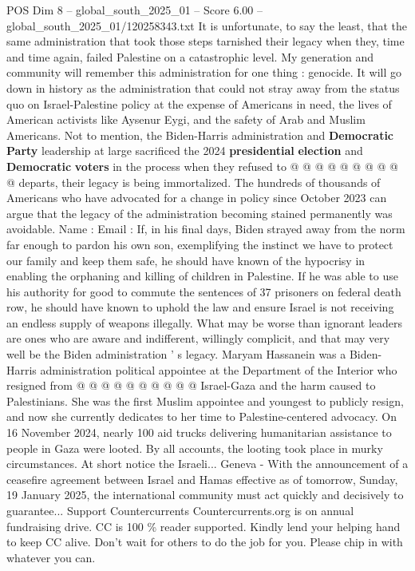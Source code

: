 \begin{textsample}{POS Dim 8 – global\_south\_2025\_01 – Score 6.00 – global\_south\_2025\_01/120258343.txt}
It is unfortunate, to say the least, that the same administration that took those steps tarnished their legacy when they, time and time again, failed Palestine on a catastrophic level.
My generation and community will remember this administration for one thing : genocide.
It will go down in history as the administration that could not stray away from the status quo on Israel-Palestine policy at the expense of Americans in need, the lives of American activists like Aysenur Eygi, and the safety of Arab and Muslim Americans.
Not to mention, the Biden-Harris administration and \textbf{Democratic} \textbf{Party} leadership at large sacrificed the 2024 \textbf{presidential} \textbf{election} and \textbf{Democratic} \textbf{voters} in the process when they refused to @ @ @ @ @ @ @ @ @ @ departs, their legacy is being immortalized.
The hundreds of thousands of Americans who have advocated for a change in policy since October 2023 can argue that the legacy of the administration becoming stained permanently was avoidable.
Name : Email : If, in his final days, Biden strayed away from the norm far enough to pardon his own son, exemplifying the instinct we have to protect our family and keep them safe, he should have known of the hypocrisy in enabling the orphaning and killing of children in Palestine.
If he was able to use his authority for good to commute the sentences of 37 prisoners on federal death row, he should have known to uphold the law and ensure Israel is not receiving an endless supply of weapons illegally.
What may be worse than ignorant leaders are ones who are aware and indifferent, willingly complicit, and that may very well be the Biden administration ' s legacy.
Maryam Hassanein was a Biden-Harris administration political appointee at the Department of the Interior who resigned from @ @ @ @ @ @ @ @ @ @ Israel-Gaza and the harm caused to Palestinians.
She was the first Muslim appointee and youngest to publicly resign, and now she currently dedicates to her time to Palestine-centered advocacy.
On 16 November 2024, nearly 100 aid trucks delivering humanitarian assistance to people in Gaza were looted.
By all accounts, the looting took place in murky circumstances.
At short notice the Israeli...
Geneva - With the announcement of a ceasefire agreement between Israel and Hamas effective as of tomorrow, Sunday, 19 January 2025, the international community must act quickly and decisively to guarantee...
Support Countercurrents Countercurrents.org is on annual fundraising drive.
CC is 100 \% reader supported.
Kindly lend your helping hand to keep CC alive.
Don't wait for others to do the job for you.
Please chip in with whatever you can.

\end{textsample}
